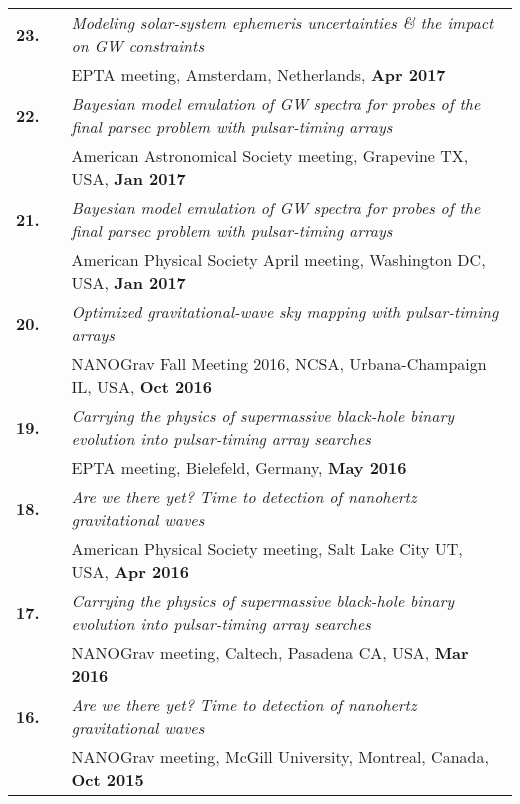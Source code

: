 \documentclass[11pt,letterpaper,sans]{moderncv}
\begin{document}
{\begin{longtable}{rp{0.3cm}p{15.8cm}}
\textbf{23.} & & \textit{Modeling solar-system ephemeris uncertainties \& the impact on GW constraints} \\ 
&& EPTA meeting, Amsterdam, Netherlands, \textbf{Apr 2017} \vspace{0.09cm}\\
\textbf{22.} & & \textit{Bayesian model emulation of GW spectra for probes of the final parsec problem with pulsar-timing arrays} \\ 
&& American Astronomical Society meeting, Grapevine TX, USA, \textbf{Jan 2017} \vspace{0.09cm}\\
\textbf{21.} & & \textit{Bayesian model emulation of GW spectra for probes of the final parsec problem with pulsar-timing arrays} \\ 
&& American Physical Society April meeting, Washington DC, USA, \textbf{Jan 2017} \vspace{0.09cm}\\
\textbf{20.} & & \textit{Optimized gravitational-wave sky mapping with pulsar-timing arrays} \\ 
&& NANOGrav Fall Meeting 2016, NCSA, Urbana-Champaign IL, USA, \textbf{Oct 2016} \vspace{0.09cm}\\
\textbf{19.} & & \textit{Carrying the physics of supermassive black-hole binary evolution into pulsar-timing array searches} \\ 
&& EPTA meeting, Bielefeld, Germany, \textbf{May 2016} \vspace{0.09cm}\\
\textbf{18.} & & \textit{Are we there yet? Time to detection of nanohertz gravitational waves} \\ 
&& American Physical Society meeting, Salt Lake City UT, USA, \textbf{Apr 2016} \vspace{0.09cm}\\
\textbf{17.} & & \textit{Carrying the physics of supermassive black-hole binary evolution into pulsar-timing array searches} \\ 
&& NANOGrav meeting, Caltech, Pasadena CA, USA, \textbf{Mar 2016} \vspace{0.09cm}\\
\textbf{16.} & & \textit{Are we there yet? Time to detection of nanohertz gravitational waves} \\ 
&& NANOGrav meeting, McGill University, Montreal, Canada, \textbf{Oct 2015} \vspace{0.09cm}\\

\end{longtable}}
\end{document}
